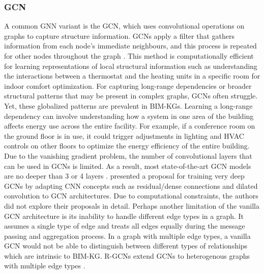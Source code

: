 \subsubsection{\acf{GCN}} 
A common \ac{GNN} variant is the \ac{GCN}, which uses convolutional operations on graphs to capture structure information. \acp{GCN} apply a filter that gathers information from each node's immediate neighbours, and this process is repeated for other nodes throughout the graph \citep{Defferrard2016ConvolutionalFiltering}. This method is computationally efficient for learning representations of local structural information such as understanding the interactions between a thermostat and the heating units in a specific room for indoor comfort optimization. For capturing long-range dependencies or broader structural patterns that may be present in complex graphs, \acp{GCN} often struggle. Yet, these globalized patterns are prevalent in \acp{BIM-KG}. Learning a long-range dependency can involve understanding how a system in one area of the building affects energy use across the entire facility. For example, if a conference room on the ground floor is in use, it could trigger adjustments in lighting and \ac{HVAC} controls on other floors to optimize the energy efficiency of the entire building. Due to the vanishing gradient problem, the number of convolutional layers that can be used in \acp{GCN} is limited. As a result, most state-of-the-art \ac{GCN} models are no deeper than 3 or 4 layers \citep{Pascanu2012OnNetworks}. \cite{Li2019DeepGCNs:CNNs} presented a proposal for training very deep \acp{GCN} by adapting \ac{CNN} concepts such as residual/dense connections and dilated convolution to \ac{GCN} architectures. Due to computational constraints, the authors did not explore their proposals in detail. Perhaps another limitation of the vanilla \ac{GCN} architecture is its inability to handle different edge types in a graph. It assumes a single type of edge and treats all edges equally during the message passing and aggregation process. In a graph with multiple edge types, a vanilla \ac{GCN} would not be able to distinguish between different types of relationships which are intrinsic to \ac{BIM-KG}. \acp{R-GCN}  extend \acp{GCN} to heterogenous graphs with multiple edge types \citep{Schlichtkrull2017ModelingNetworks}.

